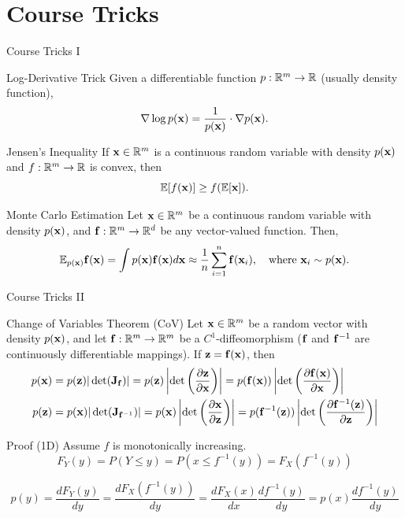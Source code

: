 \documentclass{beamer}
\renewcommand{\eqpause}{}
\renewcommand{\nextonslide}[1]{#1}
\begin{document}
\section{Course Tricks}
\begin{frame}{Course Tricks I}
	\begin{block}{Log-Derivative Trick}
		Given a differentiable function $p: \mathbb{R}^m \to \mathbb{R}$ (usually density function),
		$$
			\nabla \log p(\mathbf{x}) = \frac{1}{p(\mathbf{x})} \cdot \nabla p(\mathbf{x}).
		$$
		\vspace{-0.5cm}
	\end{block}
    \eqpause
	\begin{block}{Jensen's Inequality}
		If $\mathbf{x} \in \mathbb{R}^m$ is a continuous random variable with density $p(\mathbf{x})$ and $f: \mathbb{R}^m \to \mathbb{R}$ is convex, then
		$$
			\mathbb{E}[f(\mathbf{x})] \geq f(\mathbb{E}[\mathbf{x}]).
		$$
		\vspace{-0.7cm}
	\end{block}
    \eqpause
	\begin{block}{Monte Carlo Estimation}
		Let $\mathbf{x} \in \mathbb{R}^m$ be a continuous random variable with density $p(\mathbf{x})$, and $\mathbf{f}: \mathbb{R}^m \to \mathbb{R}^d$ be any vector-valued function. Then,
		$$
			\mathbb{E}_{p(\mathbf{x})} \mathbf{f}(\mathbf{x}) = \int p(\mathbf{x}) \mathbf{f}(\mathbf{x}) d \mathbf{x} \approx \frac{1}{n} \sum_{i=1}^n \mathbf{f}(\mathbf{x}_i), \quad 
			\text{where } \mathbf{x}_i \sim p(\mathbf{x}).
		$$
		\vspace{-0.4cm}
	\end{block}
\end{frame}
\begin{frame}{Course Tricks II}
	\begin{block}{Change of Variables Theorem (CoV)}
		Let $\mathbf{x}\in \mathbb{R}^m$ be a random vector with density $p(\mathbf{x})$, and let $\mathbf{f}: \mathbb{R}^m \rightarrow \mathbb{R}^m$ be a $C^1$-diffeomorphism ($\mathbf{f}$ and $\mathbf{f}^{-1}$ are continuously differentiable mappings). 
		If $\mathbf{z} = \mathbf{f}(\mathbf{x})$, then
		\begin{align*}
			p(\bx) &= p(\bz) |\det(\bJ_{\bff})| = p(\bz) \left|\det \left( \frac{\partial \bz}{\partial \bx} \right) \right| 
			\nextonslide{= p(\bff(\bx)) \left|\det \left(  \frac{\partial \bff(\bx)}{\partial \bx} \right) \right|} \\
			\nextonslide{p(\bz) &= p(\bx) |\det(\bJ_{\bff^{-1}})| = p(\bx) \left|\det \left(  \frac{\partial \bx}{\partial \bz} \right) \right| 
			= p(\bff^{-1}(\bz)) \left|\det \left(  \frac{\partial \bff^{-1}(\bz)}{\partial \bz} \right) \right| }
		\end{align*}
		\vspace{-0.5cm}
	\end{block}
    \eqpause
	\begin{block}{Proof (1D)}
		Assume $f$ is monotonically increasing.
		\[
			F_Y(y) = P(Y \leq y) = P(x \leq f^{-1}(y)) = F_X(f^{-1}(y))
		\]
        \eqpause
		\vspace{-0.3cm}
		$$
			p(y) = \frac{dF_Y(y)}{dy} = \frac{dF_X(f^{-1}(y))}{dy} = \frac{dF_X(x)}{dx} \frac{df^{-1}(y)}{dy} =  p(x) \frac{df^{-1}(y)}{dy}
		$$
	\end{block}
\end{frame}
\end{document}

